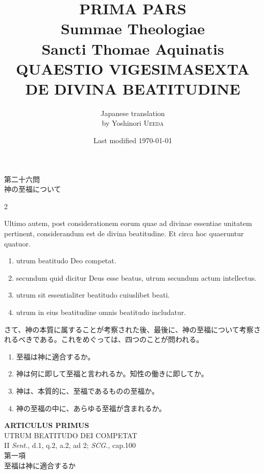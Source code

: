 \documentclass[paper=a4paper,fontsize=10pt,jafontsize=9pt,titlepage]{jlreq}
\title{{\bfseries PRIMA PARS}\\{\Huge Summae Theologiae}\\Sancti Thomae
Aquinatis\\{\sffamily QUAESTIO VIGESIMASEXTA}\\DE DIVINA
BEATITUDINE}
\author{Japanese translation\\by Yoshinori {\scshape Ueeda}}
\date{Last modified \today}
\begin{document}
\maketitle

\begin{center}
{\Large 第二十六問\\神の至福について}
\end{center}


\begin{paracol}{2}

{\Huge U}ltimo autem, post considerationem eorum quae ad divinae essentiae
 unitatem pertinent, considerandum est de divina beatitudine. Et circa
 hoc quaeruntur quatuor. 

\begin{enumerate}
 \item utrum beatitudo Deo competat.
 \item secundum quid dicitur Deus esse beatus, utrum secundum actum
 intellectus. 
 \item utrum sit essentialiter beatitudo cuiuslibet
 beati.
 \item utrum in eius beatitudine omnis beatitudo includatur.
\end{enumerate}

\switchcolumn

さて、神の本質に属することが考察された後、最後に、神の至福について考察さ
 れるべきである。これをめぐっては、四つのことが問われる。

\begin{enumerate}
 \item 至福は神に適合するか。
 \item 神は何に即して至福と言われるか。知性の働きに即してか。
 \item 神は、本質的に、至福であるものの至福か。
 \item 神の至福の中に、あらゆる至福が含まれるか。
\end{enumerate}

\end{paracol}

\newpage
{}
{}
\setcounter{section}{1}
\setcounter{subsection}{0}

\begin{center}
 {\Large {\bfseries ARTICULUS PRIMUS}}\\
 {\large UTRUM BEATITUDO DEI COMPETAT}\\
 {\footnotesize II {\itshape Sent.}, d.1, q.2, a.2, ad 2; {\itshape
 SCG.}, cap.100}\\
 {\Large 第一項\\至福は神に適合するか}
\end{center}
\end{document}
